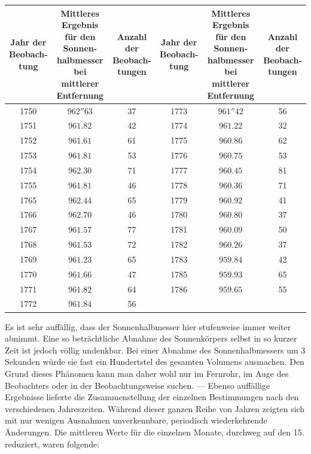 \begin{center}\small
\setlength{\tabcolsep}{1.75pt}
\begin{tabular}{c|c|c||c|c|c}
\shortstack{Jahr der\\Beobach-\\tung}&\shortstack{Mittleres Ergebnis\\für den Sonnen-\\halbmesser bei\\mittlerer\\Entfernung}&\shortstack{Anzahl der\\Beobach-\\tungen}&\shortstack{Jahr der\\Beobach-\\tung}&\shortstack{Mittleres Ergebnis\\für den Sonnen-\\halbmesser bei\\mittlerer\\Entfernung}&\shortstack{Anzahl der\\Beobach-\\tungen}\\ \hline
1750 & $962''63$ & 37 & 1773 & $961''42$ & 56 \\
1751 & $961.82$ & 42 & 1774 & $961.22$ & 32 \\
1752 & $961.61$ & 61 & 1775 & $960.86$ & 62 \\
1753 & $961.81$ & 53 & 1776 & $960.75$ & 53 \\
1754 & $962.30$ & 71 & 1777 & $960.45$ & 81 \\
1755 & $961.81$ & 46 & 1778 & $960.36$ & 71 \\
1765 & $962.44$ & 65 & 1779 & $960.92$ & 41 \\
1766 & $962.70$ & 46 & 1780 & $960.80$ & 37 \\
1767 & $961.57$ & 77 & 1781 & $960.09$ & 50 \\
1768 & $961.53$ & 72 & 1782 & $960.26$ & 37 \\
1769 & $961.23$ & 65 & 1783 & $959.84$ & 42 \\
1770 & $961.66$ & 47 & 1785 & $959.93$ & 65 \\
1771 & $961.82$ & 64 & 1786 & $959.65$ & 55 \\
1772 & $961.84$ & 56 & & & \\
\end{tabular}\end{center}

Es ist sehr auffällig, dass der Sonnenhalbmesser hier stufenweise immer weiter abnimmt. Eine so beträchtliche Abnahme des Sonnenkörpers selbst in so kurzer Zeit ist jedoch völlig undenkbar. Bei einer Abnahme des Sonnenhalbmessers um 3 Sekunden würde sie fast ein Hundertstel des gesamten Volumens ausmachen. Den Grund dieses Phänomen kann man daher wohl nur im Fernrohr, im Auge des Beobachters oder in der Beobachtungsweise suchen. — Ebenso auffällige Ergebnisse lieferte die Zusammenstellung der einzelnen Bestimmungen nach den verschiedenen Jahreszeiten. Während dieser ganzen Reihe von Jahren zeigten sich mit nur wenigen Ausnahmen unverkennbare, periodisch wiederkehrende Änderungen. Die mittleren Werte für die einzelnen Monate, durchweg auf den 15. reduziert, waren folgende:

